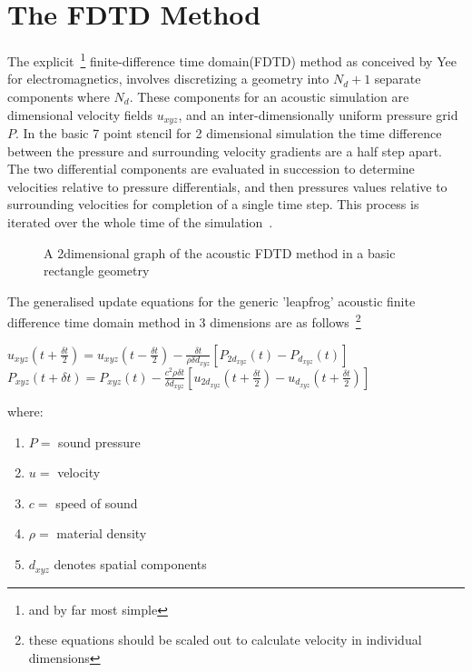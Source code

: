 \documentclass{svproc}
\begin{document}
\section{The FDTD Method}

The explicit~\footnote{and by far most simple} finite-difference time domain(FDTD) method as conceived by Yee~\cite{Yee1966} for electromagnetics, involves discretizing a geometry into $N_d+1$ separate components where $N_d$. These components for an acoustic simulation are dimensional velocity fields $\textit{u}_{xyz}$, and an  inter-dimensionally uniform pressure grid $\textit{P}$. In the basic 7 point stencil for 2 dimensional simulation the time difference between the pressure and surrounding velocity gradients are a half step apart. The two differential components are evaluated in succession to determine velocities relative to pressure differentials, and then pressures values relative to surrounding velocities for completion of a single time step. This process is iterated over the whole time of the simulation~\cite{Schneider2015}.

\begin{figure}
\centering
\centering
\caption{A 2dimensional graph of the acoustic FDTD method in a basic rectangle geometry~\cite{Hill2012}}
\end{figure}

The generalised update equations for the generic 'leapfrog' acoustic finite difference time domain method in 3 dimensions are as follows~\footnote{these equations should be scaled out to calculate velocity in individual dimensions}

\begin{center}
$u_{xyz}(t + \frac{\delta t}{2}) = u_{xyz}(t - \frac{\delta t}{2}) - \frac{ \delta t}{\rho \delta d_{xyz}} [P_{2d_{xyz}}(t) - P_{d_{xyz}}(t)]$\\
$P_{xyz}(t + \delta t) = P_{xyz}(t) - \frac{ c^2 \rho \delta t}{ \delta d_{xyz}} [u_{2d_{xyz}}(t + \frac{\delta t}{2}) - u_{d_{xyz}}(t + \frac{\delta t}{2})]$\\
\end{center}
where:
\begin{enumerate}
\item $P =$ sound pressure
\item $u =$ velocity
\item $c =$ speed of sound
\item $\rho =$  material density
\item $d_{xyz}$ denotes spatial components 
\end{enumerate}
\end{document}
